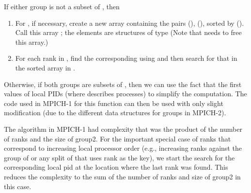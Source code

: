 \documentclass{article}
\begin{document}
If either group is not a subset of , then 
\begin{enumerate}
\item For , if necessary, create a new array containing the pairs
   (), 
  (), sorted by  (). Call this array
; the elements are 
  structures of type
  (Note that  needs to free this array.)
\item For each rank in , find the corresponding  
  using  and then search for that 
  in 
  the sorted array  in .
\end{enumerate}
Otherwise, if both groups are subsets of , then
we can use the fact that the first  values of local PIDs
(where  describes  processes) to
simplify the computation.  The code used in MPICH-1 for this function
can then be used with only slight modification (due to the different
data structures for groups in MPICH-2).

The algorithm in MPICH-1 had complexity that was the product of the
number of ranks and the size of group2.  For the important special
case of ranks that correspond to increasing local processor order
(e.g., increasing ranks against the group of  or any 
split of  that uses rank as the key), we start
the search for the corresponding local pid at the location where the
last rank was found.  This reduces the complexity to the sum of the
number of ranks and size of group2 in this case.


\end{document}
